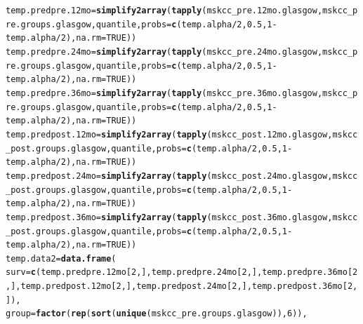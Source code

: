 \documentclass{article}\usepackage[]{graphicx}\usepackage[]{color}
\makeatletter
\newcommand{\hlnum}[1]{\textcolor[rgb]{0.686,0.059,0.569}{#1}}%
\newcommand{\hlopt}[1]{\textcolor[rgb]{0,0,0}{#1}}%
\newcommand{\hlstd}[1]{\textcolor[rgb]{0.345,0.345,0.345}{#1}}%
\newcommand{\hlkwb}[1]{\textcolor[rgb]{0.69,0.353,0.396}{#1}}%
\newcommand{\hlkwc}[1]{\textcolor[rgb]{0.333,0.667,0.333}{#1}}%
\newcommand{\hlkwd}[1]{\textcolor[rgb]{0.737,0.353,0.396}{\textbf{#1}}}%
\newenvironment{kframe}{%
 \def\at@end@of@kframe{}%
 \ifinner\ifhmode%
  \def\at@end@of@kframe{\end{minipage}}%
  \begin{minipage}{\columnwidth}%
 \fi\fi%
 \def\FrameCommand##1{\hskip\@totalleftmargin \hskip-\fboxsep
 \colorbox{shadecolor}{##1}\hskip-\fboxsep
     \hskip-\linewidth \hskip-\@totalleftmargin \hskip\columnwidth}%
 \MakeFramed {\advance\hsize-\width
   \@totalleftmargin\z@ \linewidth\hsize
   \@setminipage}}%
 {\par\unskip\endMakeFramed%
 \at@end@of@kframe}
\newenvironment{knitrout}{}{} %
\makeatother
\begin{document}
\begin{knitrout}
\begin{kframe}
\begin{alltt}
\hlstd{temp.predpre.12mo} \hlkwb{=} \hlkwd{simplify2array}\hlstd{(}\hlkwd{tapply}\hlstd{(mskcc_pre.12mo.glasgow, mskcc_pre.groups.glasgow, quantile,} \hlkwc{probs} \hlstd{=} \hlkwd{c}\hlstd{(temp.alpha}\hlopt{/}\hlnum{2}\hlstd{,} \hlnum{0.5}\hlstd{,} \hlnum{1}\hlopt{-}\hlstd{temp.alpha}\hlopt{/}\hlnum{2}\hlstd{),} \hlkwc{na.rm} \hlstd{=} \hlnum{TRUE}\hlstd{))}
\hlstd{temp.predpre.24mo} \hlkwb{=} \hlkwd{simplify2array}\hlstd{(}\hlkwd{tapply}\hlstd{(mskcc_pre.24mo.glasgow, mskcc_pre.groups.glasgow, quantile,} \hlkwc{probs} \hlstd{=} \hlkwd{c}\hlstd{(temp.alpha}\hlopt{/}\hlnum{2}\hlstd{,} \hlnum{0.5}\hlstd{,} \hlnum{1}\hlopt{-}\hlstd{temp.alpha}\hlopt{/}\hlnum{2}\hlstd{),} \hlkwc{na.rm} \hlstd{=} \hlnum{TRUE}\hlstd{))}
\hlstd{temp.predpre.36mo} \hlkwb{=} \hlkwd{simplify2array}\hlstd{(}\hlkwd{tapply}\hlstd{(mskcc_pre.36mo.glasgow, mskcc_pre.groups.glasgow, quantile,} \hlkwc{probs} \hlstd{=} \hlkwd{c}\hlstd{(temp.alpha}\hlopt{/}\hlnum{2}\hlstd{,} \hlnum{0.5}\hlstd{,} \hlnum{1}\hlopt{-}\hlstd{temp.alpha}\hlopt{/}\hlnum{2}\hlstd{),} \hlkwc{na.rm} \hlstd{=} \hlnum{TRUE}\hlstd{))}
\hlstd{temp.predpost.12mo} \hlkwb{=} \hlkwd{simplify2array}\hlstd{(}\hlkwd{tapply}\hlstd{(mskcc_post.12mo.glasgow, mskcc_post.groups.glasgow, quantile,} \hlkwc{probs} \hlstd{=} \hlkwd{c}\hlstd{(temp.alpha}\hlopt{/}\hlnum{2}\hlstd{,} \hlnum{0.5}\hlstd{,} \hlnum{1}\hlopt{-}\hlstd{temp.alpha}\hlopt{/}\hlnum{2}\hlstd{),} \hlkwc{na.rm} \hlstd{=} \hlnum{TRUE}\hlstd{))}
\hlstd{temp.predpost.24mo} \hlkwb{=} \hlkwd{simplify2array}\hlstd{(}\hlkwd{tapply}\hlstd{(mskcc_post.24mo.glasgow, mskcc_post.groups.glasgow, quantile,} \hlkwc{probs} \hlstd{=} \hlkwd{c}\hlstd{(temp.alpha}\hlopt{/}\hlnum{2}\hlstd{,} \hlnum{0.5}\hlstd{,} \hlnum{1}\hlopt{-}\hlstd{temp.alpha}\hlopt{/}\hlnum{2}\hlstd{),} \hlkwc{na.rm} \hlstd{=} \hlnum{TRUE}\hlstd{))}
\hlstd{temp.predpost.36mo} \hlkwb{=} \hlkwd{simplify2array}\hlstd{(}\hlkwd{tapply}\hlstd{(mskcc_post.36mo.glasgow, mskcc_post.groups.glasgow, quantile,} \hlkwc{probs} \hlstd{=} \hlkwd{c}\hlstd{(temp.alpha}\hlopt{/}\hlnum{2}\hlstd{,} \hlnum{0.5}\hlstd{,} \hlnum{1}\hlopt{-}\hlstd{temp.alpha}\hlopt{/}\hlnum{2}\hlstd{),} \hlkwc{na.rm} \hlstd{=} \hlnum{TRUE}\hlstd{))}
\hlstd{temp.data2} \hlkwb{=} \hlkwd{data.frame}\hlstd{(}
        \hlkwc{surv} \hlstd{=} \hlkwd{c}\hlstd{(temp.predpre.12mo[}\hlnum{2}\hlstd{,], temp.predpre.24mo[}\hlnum{2}\hlstd{,], temp.predpre.36mo[}\hlnum{2}\hlstd{,], temp.predpost.12mo[}\hlnum{2}\hlstd{,], temp.predpost.24mo[}\hlnum{2}\hlstd{,], temp.predpost.36mo[}\hlnum{2}\hlstd{,]),}
        \hlkwc{group} \hlstd{=} \hlkwd{factor}\hlstd{(}\hlkwd{rep}\hlstd{(}\hlkwd{sort}\hlstd{(}\hlkwd{unique}\hlstd{(mskcc_pre.groups.glasgow)),} \hlnum{6}\hlstd{)),}

\end{alltt}
\end{kframe}
\end{knitrout}
\end{document}
